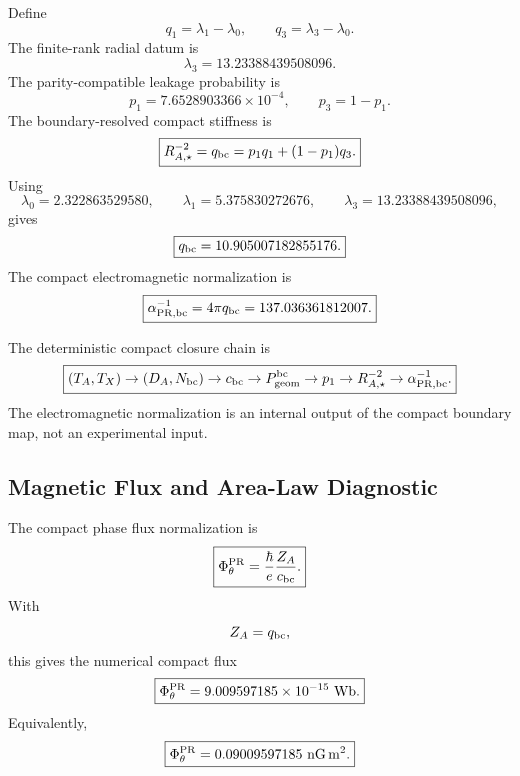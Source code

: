 \documentclass[11pt]{article}
\begin{document}
Define
\begin{equation}
\boxed{
q_1=\lambda_1-\lambda_0,
\qquad
q_3=\lambda_3-\lambda_0.
}
\end{equation}
The finite-rank radial datum is
\begin{equation}
\boxed{
\lambda_3
=
13.23388439508096.
}
\end{equation}
The parity-compatible leakage probability is
\begin{equation}
\boxed{
p_1
=
7.6528903366\times10^{-4},
\qquad
p_3=1-p_1.
}
\end{equation}
The boundary-resolved compact stiffness is
\begin{equation}
\boxed{
R_{A,\star}^{-2}
=
q_{\rm bc}
=
p_1q_1+(1-p_1)q_3.
}
\end{equation}
Using
\begin{equation}
\boxed{
\lambda_0=2.322863529580,
\qquad
\lambda_1=5.375830272676,
\qquad
\lambda_3=13.23388439508096,
}
\end{equation}
gives
\begin{equation}
\boxed{
q_{\rm bc}
=
10.905007182855176.
}
\end{equation}
The compact electromagnetic normalization is
\begin{equation}
\boxed{
\alpha_{\rm PR,bc}^{-1}
=
4\pi q_{\rm bc}
=
137.036361812007.
}
\end{equation}

The deterministic compact closure chain is
\begin{equation}
\boxed{
(T_A,T_X)
\rightarrow
(D_A,N_{\rm bc})
\rightarrow
c_{\rm bc}
\rightarrow
P_{\rm geom}^{\rm bc}
\rightarrow
p_1
\rightarrow
R_{A,\star}^{-2}
\rightarrow
\alpha_{\rm PR,bc}^{-1}.
}
\end{equation}
The electromagnetic normalization is an internal output of the compact boundary
map, not an experimental input.

\subsection{Magnetic Flux and Area-Law Diagnostic}

The compact phase flux normalization is
\begin{equation}
\boxed{
\Phi_\theta^{\rm PR}
=
\frac{\hbar}{e}
\frac{Z_A}{c_{\rm bc}}.
}
\end{equation}
With
\begin{equation}
Z_A=q_{\rm bc},
\end{equation}
this gives the numerical compact flux
\begin{equation}
\boxed{
\Phi_\theta^{\rm PR}
=
9.009597185\times10^{-15}\ {\rm Wb}.
}
\end{equation}
Equivalently,
\begin{equation}
\boxed{
\Phi_\theta^{\rm PR}
=
0.09009597185\ {\rm nG\,m^2}.
}
\end{equation}
\end{document}
